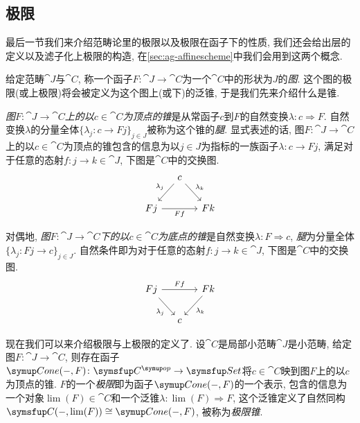 \subsection{极限}

最后一节我们来介绍范畴论里的极限以及极限在函子下的性质, 我们还会给出层的定义以及滤子化上极限的构造, 在\ref{sec:ag-affinescheme}中我们会用到这两个概念.

给定范畴$\cat{J}$与$\cat{C}$, 称一个函子$F\colon \cat{J}\to \cat{C}$为一个$\cat{C}$中的形状为$J$的\emph{图}. 这个图的极限(或上极限)将会被定义为这个图上(或下)的泛锥, 于是我们先来介绍什么是锥.

\emph{图$F\colon \cat{J}\to\cat{C}$上的以$c\in\cat{C}$为顶点的锥}是从常函子$c$到$F$的自然变换$\lambda\colon c\Rightarrow F$. 自然变换$\lambda$的分量全体$\{\lambda_j\colon c\to Fj\}_{j\in J}$被称为这个锥的\emph{腿}. 显式表述的话, 图$F\colon \cat{J}\to\cat{C}$上的以$c\in\cat{C}$为顶点的锥包含的信息为以$j\in J$为指标的一族函子$\lambda\colon c\to Fj$, 满足对于任意的态射$f\colon j\to k\in \cat{J}$, 下图是$\cat{C}$中的交换图.
\begin{equation*}
  \begin{tikzcd}[column sep=small]
    & c & \\
    Fj & & Fk
    \arrow[from=1-2,]{2-1}[swap]{\lambda_j}
    \arrow[from=1-2,]{2-3}[]{\lambda_k}
    \arrow[from=2-1,]{2-3}[below]{Ff}
  \end{tikzcd}
\end{equation*}

对偶地, \emph{图$F\colon \cat{J}\to\cat{C}$下的以$c\in\cat{C}$为底点的锥}是自然变换$\lambda\colon F\Rightarrow c$, \emph{腿}为分量全体$\{\lambda_j\colon Fj\to c\}_{j\in J}$. 自然条件即为对于任意的态射$f\colon j\to k\in \cat{J}$, 下图是$\cat{C}$中的交换图.
\begin{equation*}
  \begin{tikzcd}[column sep=small]
    Fj & & Fk\\
    & c &
    \arrow[from=1-1,]{2-2}[swap]{\lambda_j}
    \arrow[from=1-1,]{1-3}[]{Ff}
    \arrow[from=1-3,]{2-2}[]{\lambda_k}
  \end{tikzcd}
\end{equation*}

现在我们可以来介绍极限与上极限的定义了. 设$\cat{C}$是局部小范畴$\cat{J}$是小范畴, 给定图$F\colon\cat{J}\to\cat{C}$, 则存在函子$\Cone(-, F)\colon \cat{C}^{\op}\to\cat{Set}$将$c\in \cat{C}$映到图$F$上的以$c$为顶点的锥. $F$的一个\emph{极限}即为函子$\Cone (-, F)$的一个表示, 包含的信息为一个对象$\lim (F)\in \cat{C}$和一个泛锥$\lambda\colon\lim (F)\Rightarrow F$, 这个泛锥定义了自然同构$\cat{C}(-, \lim (F))\cong \Cone (-, F)$, 被称为\emph{极限锥}.

